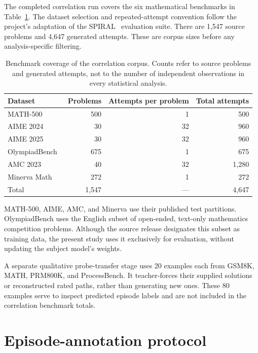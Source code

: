 \documentclass[12pt,a4paper,twoside,openright]{book}
\begin{document}
The completed correlation run covers the six mathematical benchmarks in
Table~\ref{tab:setup-benchmarks}. The dataset selection and repeated-attempt
convention follow the project's adaptation of the SPIRAL~\cite{liu2025spiral}
evaluation suite. There are 1,547 source problems and 4,647 generated
attempts. These are corpus sizes before any analysis-specific filtering.

\begin{table}[!ht]
  \centering
  \small
  \caption{Benchmark coverage of the correlation
  corpus. Counts refer to source problems and generated attempts, not to
  the number of independent observations in every statistical analysis.}
  \label{tab:setup-benchmarks}
  \begin{tabular}{@{}lrrr@{}}
    \toprule
    Dataset & Problems & Attempts per problem & Total attempts \\
    \midrule
    MATH-500~\cite{math500Dataset} & 500 & 1 & 500 \\
    AIME 2024~\cite{aime24Dataset} & 30 & 32 & 960 \\
    AIME 2025~\cite{aime25Dataset} & 30 & 32 & 960 \\
    OlympiadBench~\cite{olympiadbenchDataset} & 675 & 1 & 675 \\
    AMC 2023~\cite{amc23Dataset} & 40 & 32 & 1,280 \\
    Minerva Math~\cite{minervaDataset} & 272 & 1 & 272 \\
    \midrule
    Total & 1,547 & --- & 4,647 \\
    \bottomrule
  \end{tabular}
\end{table}

MATH-500, AIME, AMC, and Minerva use their published test partitions.
OlympiadBench uses the English subset of open-ended, text-only mathematics
competition problems. Although the source release designates this subset
as training data, the present study uses it exclusively for evaluation,
without updating the subject model's weights.

A separate qualitative probe-transfer stage uses 20 examples each from
GSM8K, MATH, PRM800K, and ProcessBench. It teacher-forces their supplied
solutions or reconstructed rated paths, rather than generating new ones.
These 80 examples serve to inspect predicted episode labels and are not
included in the correlation benchmark totals.

\section{Episode-annotation protocol}
\label{sec:setup-annotation}
\end{document}

